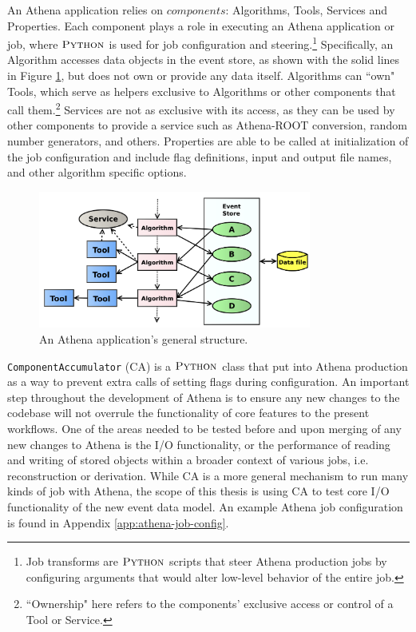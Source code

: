 An Athena application relies on $\textit{components}$: Algorithms, Tools, Services and Properties. \cite{Aad:2895022}  
Each component plays a role in executing an Athena application or job, where $\textsc{Python}$ is used for job configuration and steering.\footnote{Job transforms are $\textsc{Python}$ scripts that steer Athena production jobs by configuring arguments that would alter low-level behavior of the entire job. }
Specifically, an Algorithm accesses data objects in the event store, as shown with the solid lines in Figure \ref{fig:ATLAS_Athena_Job_flow}, but does not own or provide any data itself.
Algorithms can ``own" Tools, which serve as helpers exclusive to Algorithms or other components that call them.\footnote{``Ownership" here refers to the components' exclusive access or control of a Tool or Service.} 
Services are not as exclusive with its access, as they can be used by other components to provide a service such as Athena-ROOT conversion, random number generators, and others. 
Properties are able to be called at initialization of the job configuration and include flag definitions, input and output file names, and other algorithm specific options.

\begin{figure}[ht]
  \centering
  \includegraphics[width=0.8\textwidth]{content/img/athena job.png}
  \caption{An Athena application's general structure.\cite{Aad:2895022}}
  \label{fig:ATLAS_Athena_Job_flow}
\end{figure}

\verb|ComponentAccumulator| (CA) is a $\textsc{Python}$ class that put into Athena production as a way to prevent extra calls of setting flags during configuration. 
An important step throughout the development of Athena is to ensure any new changes to the codebase will not overrule the functionality of core features to the present workflows.
One of the areas needed to be tested before and upon merging of any new changes to Athena is the I/O functionality, or the performance of reading and writing of stored objects within a broader context of various jobs, i.e. reconstruction or derivation.
While CA is a more general mechanism to run many kinds of job with Athena, the scope of this thesis is using CA to test core I/O functionality of the new event data model. 
An example Athena job configuration is found in Appendix \ref{app:athena-job-config}. 


